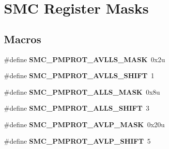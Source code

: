 \hypertarget{group___s_m_c___register___masks}{}\section{S\+MC Register Masks}
\label{group___s_m_c___register___masks}
\subsection*{Macros}
\begin{DoxyCompactItemize}
\item 
\mbox{\label{group___s_m_c___register___masks_ga62e9f3c7e74a3e5b80b0fae8a896640d}} 
\#define {\bfseries S\+M\+C\+\_\+\+P\+M\+P\+R\+O\+T\+\_\+\+A\+V\+L\+L\+S\+\_\+\+M\+A\+SK}~0x2u
\item 
\mbox{\label{group___s_m_c___register___masks_gad625b387a627eb3a69f3a26edc0096b8}} 
\#define {\bfseries S\+M\+C\+\_\+\+P\+M\+P\+R\+O\+T\+\_\+\+A\+V\+L\+L\+S\+\_\+\+S\+H\+I\+FT}~1
\item 
\mbox{\label{group___s_m_c___register___masks_ga79d87e312be895d4f2bdfdda8c947600}} 
\#define {\bfseries S\+M\+C\+\_\+\+P\+M\+P\+R\+O\+T\+\_\+\+A\+L\+L\+S\+\_\+\+M\+A\+SK}~0x8u
\item 
\mbox{\label{group___s_m_c___register___masks_gac6cb1305b9cb329a8bb903036893db11}} 
\#define {\bfseries S\+M\+C\+\_\+\+P\+M\+P\+R\+O\+T\+\_\+\+A\+L\+L\+S\+\_\+\+S\+H\+I\+FT}~3
\item 
\mbox{\label{group___s_m_c___register___masks_ga30602dafb393b5d9c52f0c75e1d78210}} 
\#define {\bfseries S\+M\+C\+\_\+\+P\+M\+P\+R\+O\+T\+\_\+\+A\+V\+L\+P\+\_\+\+M\+A\+SK}~0x20u
\item 
\mbox{\label{group___s_m_c___register___masks_gae13777e671c1caf2d10809999574fed4}} 
\#define {\bfseries S\+M\+C\+\_\+\+P\+M\+P\+R\+O\+T\+\_\+\+A\+V\+L\+P\+\_\+\+S\+H\+I\+FT}~5
\item 
\mbox{\label{group___s_m_c___register___masks_ga8df79d8a16a6d12e3b343eec59d9453c}} 

\end{DoxyCompactItemize}
